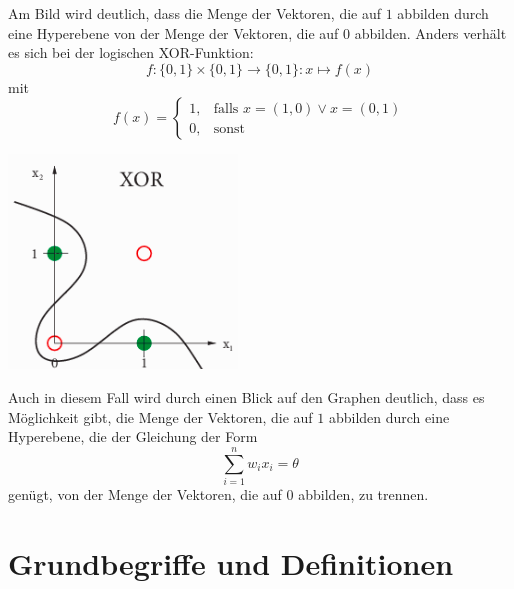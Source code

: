 \documentclass[fontsize=11pt]{scrartcl}
\newenvironment{Figure}
  {\par\medskip\noindent\minipage{\linewidth}}
  {\endminipage\par\medskip}
\newcommand*{\quelle}{%
  \footnotesize Quelle: 
}
\begin{document}
                        Am Bild wird deutlich, dass die Menge der Vektoren, die auf $1$ abbilden durch eine Hyperebene von der Menge der Vektoren, die auf $0$ abbilden.
                        \newline
                        Anders verhält es sich bei der logischen XOR-Funktion:
                        $$
                            f:\{0,1\}\times\{0,1\}\rightarrow\{0,1\}: x\mapsto f(x)
                        $$
                        mit
                        $$
                            f(x)=\left\{\begin{array}{cl} 1, & \mbox{falls }x=(1,0) \vee x = (0,1)\\
                            0, & \mbox{sonst}\end{array}\right. 
                        $$
                        \begin{Figure}
                            \centering
                            \includegraphics[scale=0.5]{XOR.png}
                            \raggedleft\footnotesize\cite[S.201. Abb. 8.8(rechts)]{ertel2016}
                        \end{Figure}
                        Auch in diesem Fall wird durch einen Blick auf den Graphen deutlich, dass es Möglichkeit gibt, die Menge der Vektoren, die auf $1$ abbilden durch eine Hyperebene, die der Gleichung der Form
                        $$
                            \sum_{i=1}^nw_ix_i = \theta
                        $$
                        genügt, von der Menge der Vektoren, die auf $0$ abbilden, zu trennen.

                        
        \section{Grundbegriffe und Definitionen}
\end{document}
